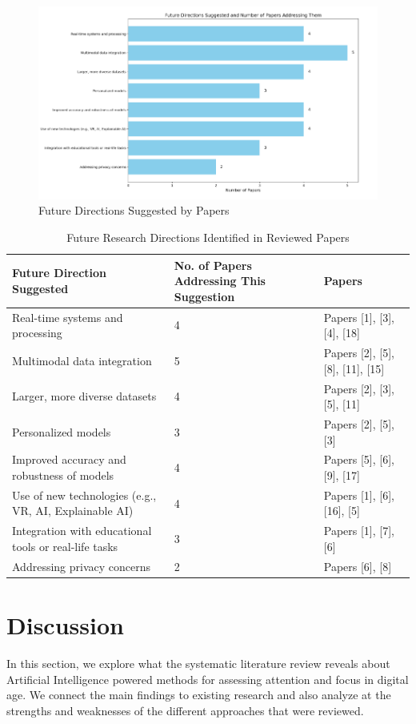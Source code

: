 \documentclass[12pt]{article}
\begin{document}
\begin{figure}[H]
\centering
\includegraphics[width=1.0\textwidth]{bar.png}
\caption{Future Directions Suggested by Papers}
\end{figure}

\begin{table}[H]
\centering
\caption{Future Research Directions Identified in Reviewed Papers}
\begin{tabular}{|p{}|p{}|p{}|}
\hline
\textbf{Future Direction Suggested} & \textbf{No. of Papers Addressing This Suggestion} & \textbf{Papers} \\
\hline
Real-time systems and processing & 4 & Papers [1], [3], [4], [18] \\
\hline
Multimodal data integration & 5 & Papers [2], [5], [8], [11], [15] \\
\hline
Larger, more diverse datasets & 4 & Papers [2], [3], [5], [11] \\
\hline
Personalized models & 3 & Papers [2], [5], [3] \\
\hline
Improved accuracy and robustness of models & 4 & Papers [5], [6], [9], [17] \\
\hline
Use of new technologies (e.g., VR, AI, Explainable AI) & 4 & Papers [1], [6], [16], [5] \\
\hline
Integration with educational tools or real-life tasks & 3 & Papers [1], [7], [6] \\
\hline
Addressing privacy concerns & 2 & Papers [6], [8] \\
\hline
\end{tabular}
\end{table}

\section{Discussion}
In this section, we explore what the systematic literature review reveals about Artificial Intelligence powered methods for assessing attention and focus in digital age. We connect the main findings to existing research and also analyze at the strengths and weaknesses of the different approaches that were reviewed.
\end{document}

